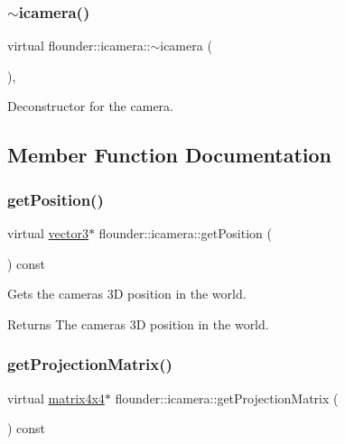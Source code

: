 \subsubsection{\texorpdfstring{$\sim$icamera()}{~icamera()}}
{\footnotesize\ttfamily virtual flounder\+::icamera\+::$\sim$icamera (\begin{DoxyParamCaption}{ }\end{DoxyParamCaption})\hspace{0.3cm}{\ttfamily [inline]}, {\ttfamily [virtual]}}



Deconstructor for the camera. 



\subsection{Member Function Documentation}
\mbox{\label{classflounder_1_1icamera_aa6639f6919b4bc30b05fc8d73bf57ab2}} 
\subsubsection{\texorpdfstring{get\+Position()}{getPosition()}}
{\footnotesize\ttfamily virtual \hyperlink{classflounder_1_1vector3}{vector3}$\ast$ flounder\+::icamera\+::get\+Position (\begin{DoxyParamCaption}{ }\end{DoxyParamCaption}) const\hspace{0.3cm}{\ttfamily [pure virtual]}}



Gets the cameras 3D position in the world. 

\begin{DoxyReturn}{Returns}
The cameras 3D position in the world. 
\end{DoxyReturn}
\mbox{\label{classflounder_1_1icamera_a271f2b8ade572d193b79abcd8a325b89}} 
\subsubsection{\texorpdfstring{get\+Projection\+Matrix()}{getProjectionMatrix()}}
{\footnotesize\ttfamily virtual \hyperlink{classflounder_1_1matrix4x4}{matrix4x4}$\ast$ flounder\+::icamera\+::get\+Projection\+Matrix (\begin{DoxyParamCaption}{ }\end{DoxyParamCaption}) const\hspace{0.3cm}{\ttfamily [pure virtual]}}



